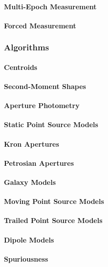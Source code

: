 \paragraph{Multi-Epoch Measurement}
\paragraph{Forced Measurement}

\subsubsection{Algorithms}
\paragraph{Centroids}
\paragraph{Second-Moment Shapes}
\paragraph{Aperture Photometry}
\paragraph{Static Point Source Models}
\paragraph{Kron Apertures}
\paragraph{Petrosian Apertures}
\paragraph{Galaxy Models}
\paragraph{Moving Point Source Models}
\paragraph{Trailed Point Source Models}
\paragraph{Dipole Models}
\paragraph{Spuriousness}

